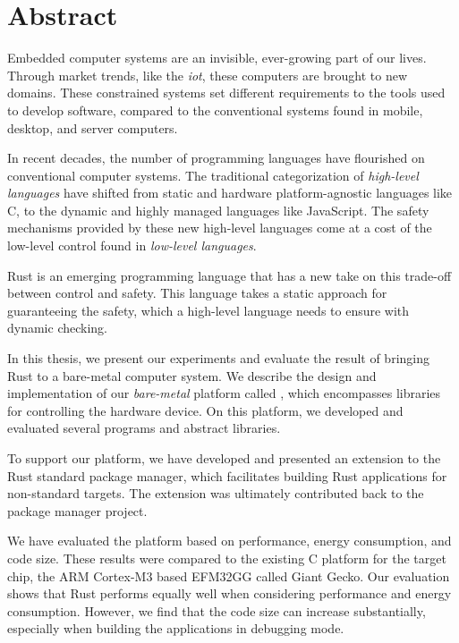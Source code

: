 
\chapter{Abstract}
\label{chap:abstract}

Embedded computer systems are an invisible, ever-growing part of our lives.
Through market trends, like the \emph{\glsdesc{iot}}, these computers are brought to new domains.
These constrained systems set different requirements to the tools used to develop software, compared to the conventional systems found in mobile, desktop, and server computers.

In recent decades, the number of programming languages have flourished on conventional computer systems.
The traditional categorization of \emph{high-level languages} have shifted from static and hardware platform-agnostic languages like C, to the dynamic and highly managed languages like JavaScript.
The safety mechanisms provided by these new high-level languages come at a cost of the low-level control found in \emph{low-level languages}.

Rust is an emerging programming language that has a new take on this trade-off between control and safety.
This language takes a static approach for guaranteeing the safety, which a high-level language needs to ensure with dynamic checking.

In this thesis, we present our experiments and evaluate the result of bringing Rust to a bare-metal computer system.
We describe the design and implementation of our \emph{bare-metal} platform called {\rg}, which encompasses libraries for controlling the hardware device.
On this platform, we developed and evaluated several programs and abstract libraries.

To support our platform, we have developed and presented an extension to the Rust standard package manager, which facilitates building Rust applications for non-standard targets.
The extension was ultimately contributed back to the package manager project.

We have evaluated the platform based on performance, energy consumption, and code size.
These results were compared to the existing C platform for the target chip, the ARM Cortex-M3 based EFM32GG called Giant Gecko.
Our evaluation shows that Rust performs equally well when considering performance and energy consumption.
However, we find that the code size can increase substantially, especially when building the applications in debugging mode.
